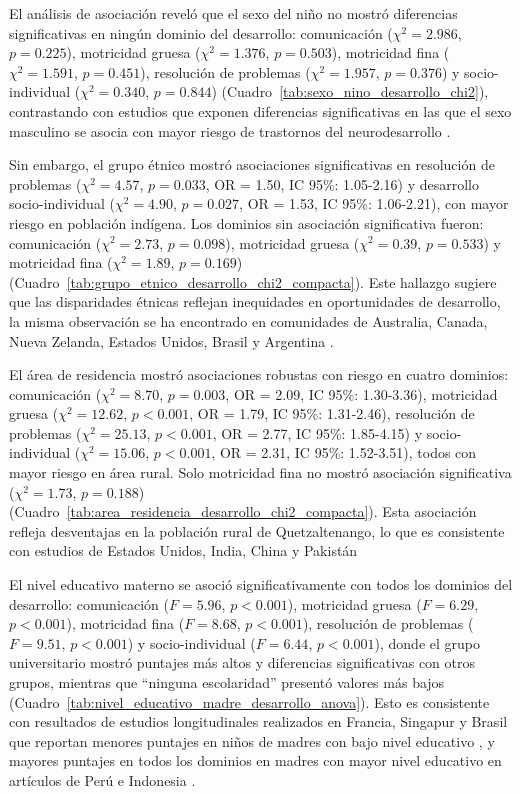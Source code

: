El análisis de asociación reveló que el sexo del niño no mostró diferencias 
significativas en ningún dominio del desarrollo: comunicación 
($\chi^2 = 2.986$, $p = 0.225$), motricidad gruesa ($\chi^2 = 1.376$, 
$p = 0.503$), motricidad fina ($\chi^2 = 1.591$, $p = 0.451$), resolución 
de problemas ($\chi^2 = 1.957$, $p = 0.376$) y socio-individual 
($\chi^2 = 0.340$, $p = 0.844$) (Cuadro~\ref{tab:sexo_nino_desarrollo_chi2}), 
contrastando con estudios que exponen diferencias significativas en las que
el sexo masculino se asocia con mayor riesgo de trastornos del neurodesarrollo \cite{Sudry2024,Christensen2025,Peyre2019,Nishimura2016}.

Sin embargo, el grupo étnico mostró asociaciones significativas en resolución 
de problemas ($\chi^2 = 4.57$, $p = 0.033$, OR = 1.50, IC 95\%: 1.05-2.16) 
y desarrollo socio-individual ($\chi^2 = 4.90$, $p = 0.027$, OR = 1.53, 
IC 95\%: 1.06-2.21), con mayor riesgo en población indígena. Los dominios sin 
asociación significativa fueron: comunicación ($\chi^2 = 2.73$, $p = 0.098$), 
motricidad gruesa ($\chi^2 = 0.39$, $p = 0.533$) y motricidad fina 
($\chi^2 = 1.89$, $p = 0.169$) 
(Cuadro~\ref{tab:grupo_etnico_desarrollo_chi2_compacta}). Este hallazgo 
sugiere que las disparidades étnicas reflejan inequidades en oportunidades de
desarrollo, la misma observación se ha encontrado en comunidades de Australia, Canada, Nueva Zelanda, Estados Unidos, Brasil y Argentina
\cite{Lau2022,Hanly2020,Wehby2017}.

El área de residencia mostró asociaciones robustas con riesgo en cuatro 
dominios: comunicación ($\chi^2 = 8.70$, $p = 0.003$, OR = 2.09, 
IC 95\%: 1.30-3.36), motricidad gruesa ($\chi^2 = 12.62$, $p < 0.001$, 
OR = 1.79, IC 95\%: 1.31-2.46), resolución de problemas ($\chi^2 = 25.13$, 
$p < 0.001$, OR = 2.77, IC 95\%: 1.85-4.15) y socio-individual 
($\chi^2 = 15.06$, $p < 0.001$, OR = 2.31, IC 95\%: 1.52-3.51), todos con 
mayor riesgo en área rural. Solo motricidad fina no mostró asociación 
significativa ($\chi^2 = 1.73$, $p = 0.188$) 
(Cuadro~\ref{tab:area_residencia_desarrollo_chi2_compacta}). Esta asociación
refleja desventajas en la población rural de Quetzaltenango, lo que es consistente con estudios de Estados Unidos, India, China y Pakistán \cite{Zablotsky2020-tb,Chatterjee2020,Murthy2020,Wang2020,Avan2010}

El nivel educativo materno se asoció significativamente con todos los dominios 
del desarrollo: comunicación ($F = 5.96$, $p < 0.001$), motricidad gruesa 
($F = 6.29$, $p < 0.001$), motricidad fina ($F = 8.68$, $p < 0.001$), 
resolución de problemas ($F = 9.51$, $p < 0.001$) y socio-individual 
($F = 6.44$, $p < 0.001$), donde el grupo universitario mostró puntajes más 
altos y diferencias significativas con otros grupos, mientras que ``ninguna 
escolaridad'' presentó valores más bajos 
(Cuadro~\ref{tab:nivel_educativo_madre_desarrollo_anova}). Esto es consistente
con resultados de estudios longitudinales realizados en Francia, Singapur y Brasil que reportan menores puntajes en niños de madres con bajo nivel educativo \cite{Charkaluk2024,Lockhart2023,Yeleswarapu2025,Munhoz2022}, y mayores puntajes en todos los dominios en madres con mayor nivel educativo en artículos de Perú e Indonesia \cite{Handal2007,Hanifah2022}.


